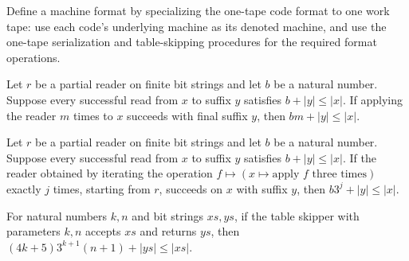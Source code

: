 \begin{definition}
\label{Turing.oneTapeMachineFormat}
\leanok
{}
Define a machine format by specializing the one-tape code format to one work tape: use
each code's underlying machine as its denoted machine, and use the one-tape
serialization and table-skipping procedures for the required format operations.
\end{definition}

\begin{lemma}
\label{Turing.MachineFormat.skipRepeat_consumes}
\leanok
{}
Let $r$ be a partial reader on finite bit strings and let $b$ be a natural number.
Suppose every successful read from $x$ to suffix $y$ satisfies $b+|y|\le |x|$. If
applying the reader $m$ times to $x$ succeeds with final suffix $y$, then $bm+|y|\le
|x|$.
\end{lemma}

\begin{lemma}
\label{Turing.MachineFormat.skipSymbols_consumes}
\leanok
{}
Let $r$ be a partial reader on finite bit strings and let $b$ be a natural number.
Suppose every successful read from $x$ to suffix $y$ satisfies $b+|y|\le |x|$. If the
reader obtained by iterating the operation $f\mapsto (x\mapsto\text{apply }f\text{ three
times})$ exactly $j$ times, starting from $r$, succeeds on $x$ with suffix $y$, then
$b3^j+|y|\le |x|$.
\end{lemma}

\begin{lemma}
\label{Turing.MachineFormat.skipTable_consumes}
\leanok
{}
For natural numbers $k,n$ and bit strings $xs,ys$, if the table skipper with parameters
$k,n$ accepts $xs$ and returns $ys$, then $(4k+5)3^{k+1}(n+1)+|ys|\le |xs|$.
\end{lemma}

